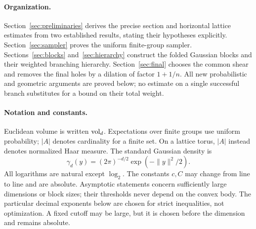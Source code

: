 \paragraph{Organization.}
Section~\ref{sec:preliminaries} derives the precise section and horizontal
lattice estimates from two established results, stating their hypotheses
explicitly. Section~\ref{sec:sampler} proves the uniform finite-group
sampler. Sections~\ref{sec:blocks} and~\ref{sec:hierarchy} construct
the folded Gaussian blocks and their weighted branching hierarchy.
Section~\ref{sec:final} chooses the common shear and removes the final
holes by a dilation of factor $1+1/n$. All new probabilistic and
geometric arguments are proved below; no estimate on a single successful
branch substitutes for a bound on their total weight.

\paragraph{Notation and constants.}
Euclidean volume is written $\operatorname{vol}_d$. Expectations over finite groups
use uniform probability; $|A|$ denotes cardinality for a finite set.
On a lattice torus, $|A|$ instead denotes normalized Haar measure.
The standard Gaussian density is
\[
 \gamma_d(y)=(2\pi)^{-d/2}\exp(-\|y\|^2/2).
\]
All logarithms are natural except $\log_2$. The constants $c,C$ may
change from line to line and are absolute. Asymptotic statements concern
sufficiently large dimensions or block sizes; their thresholds never
depend on the convex body. The particular decimal exponents below are
chosen for strict inequalities, not optimization. A fixed cutoff may be
large, but it is chosen before the dimension and remains absolute.

